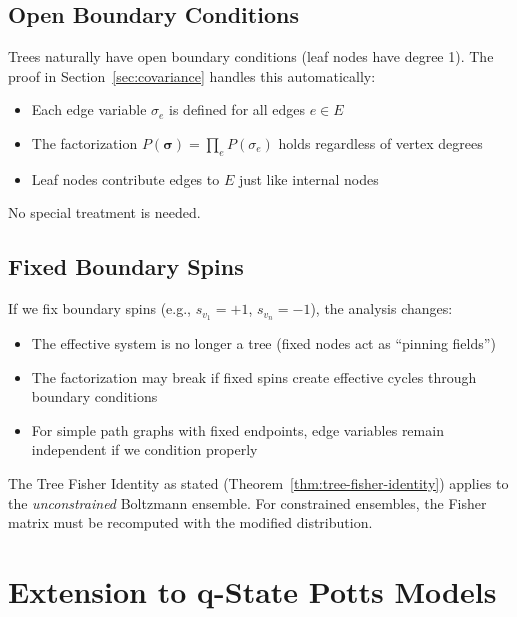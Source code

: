 \documentclass[11pt]{article}
\theoremstyle{definition}
\theoremstyle{remark}
\begin{document}
\subsection{Open Boundary Conditions}

Trees naturally have open boundary conditions (leaf nodes have degree 1).
The proof in Section~\ref{sec:covariance} handles this automatically:

\begin{itemize}
\item Each edge variable $\sigma_e$ is defined for all edges $e \in E$

\item The factorization $P(\boldsymbol{\sigma}) = \prod_e P(\sigma_e)$
holds regardless of vertex degrees

\item Leaf nodes contribute edges to $E$ just like internal nodes
\end{itemize}

No special treatment is needed.

\subsection{Fixed Boundary Spins}

If we fix boundary spins (e.g., $s_{v_1} = +1$, $s_{v_n} = -1$), the
analysis changes:

\begin{itemize}
\item The effective system is no longer a tree (fixed nodes act as
``pinning fields'')

\item The factorization may break if fixed spins create effective cycles
through boundary conditions

\item For simple path graphs with fixed endpoints, edge variables remain
independent if we condition properly
\end{itemize}

The Tree Fisher Identity as stated (Theorem~\ref{thm:tree-fisher-identity})
applies to the \emph{unconstrained} Boltzmann ensemble. For constrained
ensembles, the Fisher matrix must be recomputed with the modified
distribution.

\section{Extension to q-State Potts Models}
\end{document}
